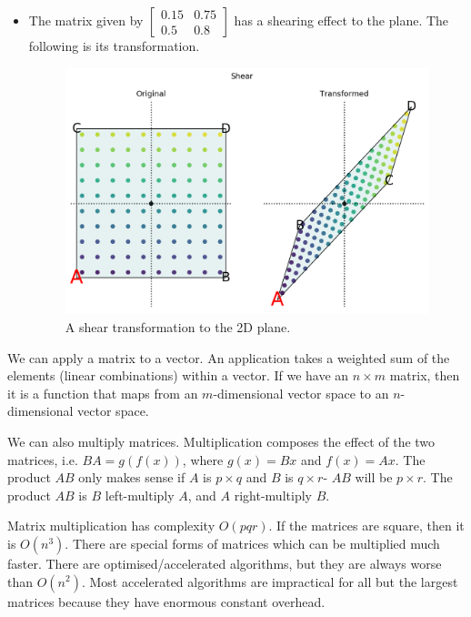 \documentclass[a4paper, openany]{memoir}
\begin{document}
\begin{itemize}
        \item The matrix given by $\begin{bmatrix}
            0.15 & 0.75 \\
            0.5 & 0.8
        \end{bmatrix}$ has a shearing effect to the plane. The following is its transformation.
        \begin{figure}[H]
            \centering
            \includegraphics[scale=0.4]{src/3.15 Shear.png}
            \caption{A shear transformation to the 2D plane.}
        \end{figure}    
    \end{itemize}

    We can apply a matrix to a vector. An application takes a weighted sum of the elements (linear combinations) within a vector. If we have an $n \times m$ matrix, then it is a function that maps from an $m$-dimensional vector space to an $n$-dimensional vector space.

    We can also multiply matrices. Multiplication composes the effect of the two matrices, i.e. $BA = g(f(x))$, where $g(x)= Bx$ and $f(x) = Ax$. The product $AB$ only makes sense if $A$ is $p \times q$ and $B$ is $q \times r$- $AB$ will be $p \times r$. The product $AB$ is $B$ left-multiply $A$, and $A$ right-multiply $B$.

    Matrix multiplication has complexity $O(pqr)$. If the matrices are square, then it is $O(n^3)$. There are special forms of matrices which can be multiplied much faster. There are optimised/accelerated algorithms, but they are always worse than $O(n^2)$. Most accelerated algorithms are impractical for all but the largest matrices because they have enormous constant overhead.
\end{document}
